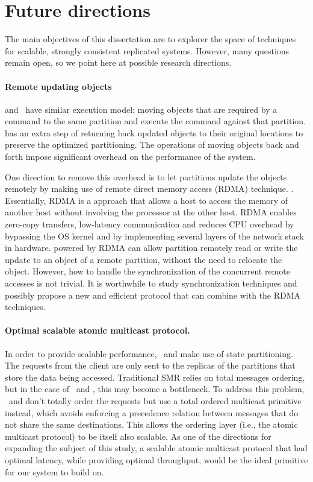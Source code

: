\section{Future directions}

The main objectives of this dissertation are to explorer the space of techniques
for scalable, strongly consistent replicated systems. However, many questions
remain open, so we point here at possible research directions.

\paragraph{Remote updating objects} \dynastar and \dssmr\ have similar execution
model: moving objects that are required by a command to the same partition and
execute the command against that partition. \dynastar has an extra step of
returning back updated objects to their original locations to preserve the
optimized partitioning. The operations of moving objects back and forth impose
significant overhead on the performance of the system. 

One direction to remove this overhead is to let partitions update the objects
remotely by making use of remote direct memory access (RDMA) technique.
\cite{recio2007remote,dragojevic2014farm}. Essentially, RDMA is a approach
that allows a host to access the memory of another host without involving the
processor at the other host. RDMA enables zero-copy transfers, low-latency
communication and reduces CPU overhead by bypassing the OS kernel and by
implementing several layers of the network stack in hardware. \dynastar powered
by RDMA can allow  partition remotely read or write the update to an object
of a remote partition, without the need to relocate the object. However, how
to handle the synchronization of the concurrent remote accesses is not trivial.
It is worthwhile to study synchronization techniques and possibly propose a new
and efficient protocol that can combine \dynastar with the RDMA techniques.

\paragraph{Optimal scalable atomic multicast protocol.} 
In order to provide scalable performance, \dssmr\ and \dynastar make use of
state partitioning. The requests from the client are only sent to the replicas
of the partitions that store the data being accessed. Traditional SMR relies on
total messages ordering, but in the case of \dssmr\ and \dynastar, this may
become a bottleneck. To address this problem, \dssmr\ and \dynastar don't
totally order the requests but use a total ordered multicast primitive instead,
which avoids enforcing a precedence relation between messages that do not share
the same destinations. This allows the ordering layer (i.e., the atomic
multicast protocol) to be itself also scalable.  As one of the directions for
expanding the subject of this study, a scalable atomic multicast protocol that
had optimal latency, while providing optimal throughput, would be the ideal
primitive for our system to build on.


